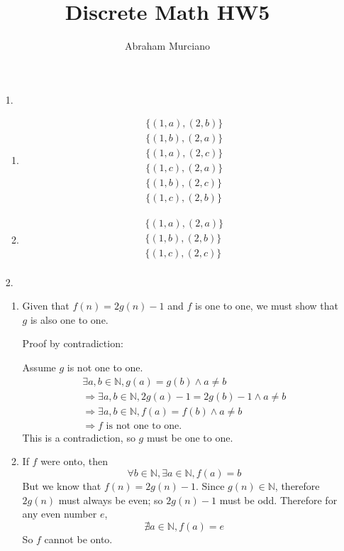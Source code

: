 \documentclass[fleqn]{article}
\title{Discrete Math HW5}
\author{Abraham Murciano}
\begin{document}
\maketitle

\begin{enumerate}
	\item[1.]
	\begin{enumerate}
		\item %
		\begin{gather*}
			\{(1, a), (2, b)\} \\
			\{(1, b), (2, a)\} \\
			\{(1, a), (2, c)\} \\
			\{(1, c), (2, a)\} \\
			\{(1, b), (2, c)\} \\
			\{(1, c), (2, b)\}
		\end{gather*}
		
		\item %
		\begin{gather*}
			\{(1, a), (2, a)\} \\
			\{(1, b), (2, b)\} \\
			\{(1, c), (2, c)\} \\
		\end{gather*}
	\end{enumerate}

	\item[2.]
	\begin{enumerate}
		\item %
		Given that \(f(n) = 2g(n) - 1\) and \(f\) is one to one, we must show that \(g\) is also one to one.

		Proof by contradiction:

		Assume \(g\) is not one to one.
		\begin{gather*}
			\exists a, b \in \mathbb{N}, g(a) = g(b) \land a \neq b \\
			\Rightarrow \exists a, b \in \mathbb{N}, 2g(a) - 1 = 2g(b) - 1 \land a \neq b \\
			\Rightarrow \exists a, b \in \mathbb{N}, f(a) = f(b) \land a \neq b \\
			\Rightarrow f \text{ is not one to one.}
		\end{gather*}
		This is a contradiction, so \(g\) must be one to one.

		\item %
		If \(f\) were onto, then
		\[\forall b \in \mathbb{N}, \exists a \in \mathbb{N}, f(a) = b\]
		But we know that \(f(n) = 2g(n) - 1\). Since \(g(n) \in \mathbb{N}\), therefore \(2g(n)\) must always be even; so \(2g(n) - 1\) must be odd. Therefore for any even number \(e\),
		\[\nexists a \in \mathbb{N}, f(a) = e\]
		So \(f\) cannot be onto.


\end{enumerate}
\end{enumerate}
\end{document}
